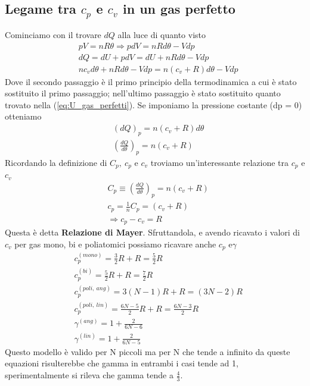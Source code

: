 \documentclass[10pt,a4paper]{article}
\begin{document}
\subsection{Legame tra $c_p$ e $c_v$ in un gas perfetto}
Cominciamo con il trovare \(dQ\) alla luce di quanto visto
\begin{align*}
	&pV = n R \theta \Rightarrow pdV = nRd\theta - Vdp \\
	&dQ = dU+pdV = dU + nRd\theta - Vdp \\
	&n c_vd\theta +nRd\theta - Vdp = n(c_v+R)d\theta-Vdp
\end{align*}
Dove il secondo passaggio è il primo principio della termodinamica a cui è stato sostituito il primo passaggio; nell'ultimo passaggio è stato sostituito quanto trovato nella (\ref{eq:U_gas_perfetti}). Se imponiamo la pressione costante (dp = 0) otteniamo
\begin{align*}
	&(dQ)_p=n(c_v+R)d\theta\\
	&\left(\frac{dQ}{d\theta}\right)_p = n(c_v+R)
\end{align*}
Ricordando la definizione di \(C_p,\ c_p\) e \(c_v\) troviamo un'interessante relazione tra $c_p$ e $c_v$
\begin{align}\label{eq:relazione_di_Mayer}
	&C_p \equiv \left(\frac{dQ}{d\theta}\right)_p = n(c_v+R)\nonumber\\
	&c_p = \frac{1}{n} C_p = (c_v + R)\nonumber\\
	& \Rightarrow c_p - c_v = R
\end{align}
Questa è detta \textbf{Relazione di Mayer}. Sfruttandola, e avendo ricavato i valori di $c_v$ per gas mono, bi e poliatomici possiamo ricavare anche \(c_p \) e\(\gamma\)
\begin{align*}
	&c_p^{(mono)} = \frac{3}{2}R + R = \frac{5}{2}R\\
	&c_p^{(bi)} = \frac{5}{2}R + R = \frac{7}{2} R\\
	&c_p^{(poli,\ ang)} = 3(N-1)R + R = (3N - 2) R\\
	&c_p^{(poli,\ lin)} =  \frac{6N-5}{2}R + R = \frac{6N-3}{2}R\\
	&\gamma^{(ang)} = 1 + \frac{2}{6 N - 6}\\
	&\gamma^{(lin)} = 1 + \frac{2}{6 N - 5}
\end{align*}
Questo modello è valido per N piccoli ma per N che tende a infinito da queste equazioni risulterebbe che gamma in entrambi i casi tende ad 1, sperimentalmente si rileva che gamma tende a $\frac{4}{3}$.
\end{document}
